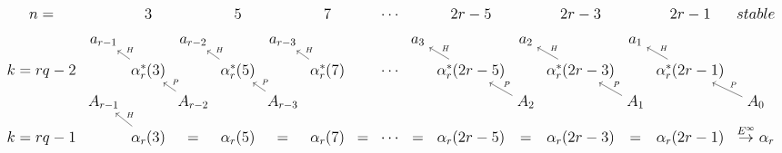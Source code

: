 \documentclass{article}
\begin{document}
\(
\begin{tikzcd}[nodes={font=\Large},row sep=0.3cm,column sep=0.1cm]
n= & & 3 & & 5 & & 7 & & \cdots & & 2r-5 & & 2r-3 &  & 2r-1 & stable \\
 & a_{r-1} & & a_{r-2} & & a_{r-3} & & & & a_3& & a_2 & & a_1 \\
k=rq-2 & & \alpha_r^*(3) \arrow[lu,"H"'] & & \alpha_r^*(5) \arrow[lu,"H"'] & & \alpha_r^*(7) \arrow[lu,"H"'] & & \cdots & & \alpha_r^*(2r-5) \arrow[lu,"H"'] & & \alpha_r^*(2r-3) \arrow[lu,"H"'] & & \alpha_r^*(2r-1) \arrow[lu,"H"'] & & \\
& A_{r-1} & & A_{r-2} \arrow[lu,"P"'] & & A_{r-3} \arrow[lu,"P"'] & & & & & & A_{2} \arrow[lu,"P"'] & & A_{1} \arrow[lu,"P"'] & & A_{0} \arrow[lu,"P"']\\
k=rq-1 & & \alpha_r(3) \arrow[lu,"H"'] & = & \alpha_r(5) & = & \alpha_r(7) & = & \cdots & = & \alpha_r(2r-5) & = & \alpha_r(2r-3) & = & \alpha_r(2r-1) & \stackrel{E^\infty}{\rightarrow} \alpha_r 
\end{tikzcd}
\)
\end{document}
